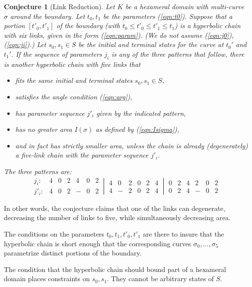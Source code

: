 \documentclass[11pt]{amsart}
\newtheorem{conj}{Conjecture}
\begin{document}
\begin{conj}[Link Reduction] \label{conj:defrag}
Let $K$ be a hexameral domain with multi-curve $\sigma$ around the
boundary. 
Let $t_0,t_1$ be the parameters (\ref{eqn:t0}).  Suppose
that a portion $[t'_0,t'_1]$ of the boundary (with $t_0\le t'_0\le t'_1\le t_1$) is a hyperbolic chain with six
links, given in the form (\ref{eqn:param}).  (We do not assume (\ref{eqn:j0}), (\ref{eqn:ji}).)  Let $s_0,s_1\in S$ be the initial and terminal states
for the curve at $t_0'$ and $t_1'$.
If the sequence of parameters $j_i$ is any of the three patterns
that follow, there is another hyperbolic chain with five links
that 
\begin{itemize}
\item fits the same initial and terminal states $s_0,s_1\in S$,
\item satisfies the angle condition (\ref{eqn:arg}),
\item has parameter sequence $j'_i$ given by the indicated pattern,
\item has no greater area $I(\sigma)$ as defined by (\ref{eqn:Isigma}),
\item and in fact has strictly smaller area, unless the chain is already (degenerately) a 
five-link chain with the parameter sequence $j'_i$.
\end{itemize}
The three patterns are:
$$
\begin{array}{llllllllllllllllll}
j_i: &4&0&2&4&0&2\\
j'_i: &4&0&2&-&0&2
\end{array}
~\left|~
\begin{array}{llllllllllllllllll}
4&0&2&0&2&4\\
4&-&2&0&2&4
\end{array}
~\right|~
\begin{array}{llllllllllllllllll}
0&2&4&2&0&2 \\
0&2&4&-&0&2
\end{array}
$$
\end{conj}

In other words, the conjecture claims that one of the links can degenerate, decreasing the number of links to five, while simultaneously
decreasing area.

The conditions on the parameters $t_0,t_1,t'_0,t'_1$ are there
to insure that the hyperbolic chain is short enough that the corresponding curves $\sigma_0,\ldots,\sigma_5$ parametrize distinct portions
of the boundary.

The condition that the hyperbolic chain should bound part of a hexameral
domain places constraints on $s_0,s_1$.  They cannot be arbitrary
states of $S$.
\end{document}
